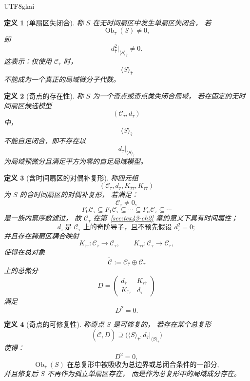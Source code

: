 \documentclass[12pt]{article}
\newtheorem{definition}{定义}[section]
\begin{document}
\begin{CJK*}{UTF8}{gkai}
\begin{definition}[单扇区失闭合]
\label{def:tex43-single-sector-failure}
称 $S$ 在无时间扇区中发生\emph{单扇区失闭合}，
若
\[
  \operatorname{Ob}_{\bar\tau}(S)\neq 0,
\]
即
\[
  d_{\bar\tau}^2\big|_{\langle S\rangle_{\bar\tau}}\neq 0.
\]
这表示：仅使用 $\mathcal C_{\bar\tau}$ 时，
\[
  \langle S\rangle_{\bar\tau}
\]
不能成为一个真正的局域微分子代数。
\end{definition}

\begin{definition}[奇点的存在性]
\label{def:tex43-singularity-existence}
称 $S$ 为一个\emph{奇点}或\emph{奇点类失闭合局域}，
若在固定的无时间扇区候选模型
\[
  (\mathcal C_{\bar\tau},d_{\bar\tau})
\]
中，
\[
  \langle S\rangle_{\bar\tau}
\]
不能自足闭合，即不存在以
\[
  d_{\bar\tau}\big|_{\langle S\rangle_{\bar\tau}}
\]
为局域预微分且满足平方为零的自足局域模型。
\end{definition}

\begin{definition}[含时间扇区的对偶补复形]
\label{def:tex43-time-complement-complex}
称四元组
\[
  (\mathcal C_{\tau},d_{\tau},K_{\bar\tau\tau},K_{\tau\bar\tau})
\]
为 $S$ 的\emph{含时间扇区的对偶补复形}，
若满足：
\[
  \mathcal C_{\tau}\neq 0,
\]
\[
  F_0\mathcal C_\tau \subseteq F_1\mathcal C_\tau \subseteq \cdots \subseteq F_\alpha\mathcal C_\tau \subseteq \cdots
\]
是一族内禀序数滤过，
故 $\mathcal C_\tau$ 在第~\ref{sec:tex43-ch2} 章的意义下具有时间属性；
\[
  d_\tau\ \text{是 }\mathcal C_\tau\text{ 上的奇阶导子，且不预先假设 }d_\tau^2=0;
\]
并且存在跨扇区耦合映射
\[
  K_{\bar\tau\tau}:\mathcal C_{\bar\tau}\to \mathcal C_\tau,
  \qquad
  K_{\tau\bar\tau}:\mathcal C_\tau\to \mathcal C_{\bar\tau},
\]
使得在总对象
\[
  \widetilde{\mathcal C}
  :=
  \mathcal C_{\bar\tau}\oplus \mathcal C_\tau
\]
上的总微分
\[
  D=
  \begin{pmatrix}
    d_{\bar\tau} & K_{\tau\bar\tau}\\
    K_{\bar\tau\tau} & d_\tau
  \end{pmatrix}
\]
满足
\[
  D^2=0.
\]
\end{definition}

\begin{definition}[奇点的可修复性]
\label{def:tex43-singularity-repairability}
称奇点 $S$ 是\emph{可修复}的，
若存在某个总复形
\[
  (\widetilde{\mathcal C},D)
  \supseteq
  \big(\langle S\rangle_{\bar\tau},d_{\bar\tau}\big|_{\langle S\rangle_{\bar\tau}}\big)
\]
使得：
\[
  D^2=0,
\]
\[
  \operatorname{Ob}_{\bar\tau}(S)
  \text{ 在总复形中被吸收为总边界或总闭合条件的一部分},
\]
并且修复后 $S$ 不再作为孤立单扇区存在，
而是作为总复形中的局域成分存在。
\end{definition}


\end{CJK*}
\end{document}
